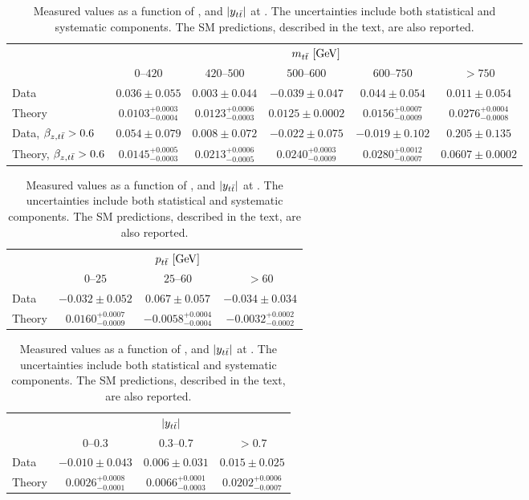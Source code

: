 \begin{table}[!htp]\centering
\begin{tabular}{l c c c c c }
  \toprule
  &\multicolumn{5}{c}{$m_{t\bar{t}}{}~[\rm{GeV}]$}    \\
  \ac{} & $0$--$420$ & $420$--$500$ & $500$--$600$ & $600$--$750$ & $>750$ \\
  \midrule
  Data & $0.036\pm0.055$ & $0.003\pm0.044$ & $-0.039\pm0.047$ & $0.044\pm0.054$ & $0.011\pm0.054$ \\
  Theory & $0.0103^{+0.0003}_{-0.0004}$ & $0.0123^{+0.0006}_{-0.0003}$ & $0.0125\pm0.0002$ & $0.0156^{+0.0007}_{-0.0009}$ & $0.0276^{+0.0004}_{-0.0008}$ \\
  \midrule
  Data, $\beta_{z,t\bar{t}}{}>0.6$  & $0.054 \pm  0.079 $ & $0.008 \pm 0.072  $ & $-0.022 \pm 0.075 $ & $-0.019 \pm 0.102    $ & $0.205 \pm 0.135$ \\
  Theory, $\beta_{z,t\bar{t}}{}>0.6$ & $0.0145^{+0.0005}_{-0.0003}$ & $0.0213^{+0.0006}_{-0.0005}$ & $0.0240^{+0.0003}_{-0.0009}$ & $0.0280^{+0.0012}_{-0.0007}$ & $0.0607 \pm 0.0002$ \\
  \bottomrule
\end{tabular}
\begin{tabular}{l c c c }
  \toprule
  &\multicolumn{3}{c}{$p_{t\bar{t}}{}~[\rm{GeV}]$}    \\
  \ac{} &     $0$--$25$           &        $25$--$60$         &  $>60$            \\
  \midrule
  Data  &    $-0.032\pm0.052$       &     $0.067\pm0.057$       &      $-0.034\pm0.034$     \\
  Theory & $0.0160^{+0.0007}_{-0.0009}$ & $-0.0058^{+0.0004}_{-0.0004}$ & $-0.0032^{+0.0002}_{-0.0002}$  \\
  \bottomrule
\end{tabular}
\begin{tabular}{l c c c }
  \toprule
  &\multicolumn{3}{c}{$|y_{t\bar{t}}{}|$}    \\
  \ac{}  &     $0$--$0.3$          &        $0.3$--$0.7$     &  $>0.7$            \\
  \midrule
  Data  &    $-0.010\pm0.043$       &     $0.006\pm0.031$     &      $0.015\pm0.025$     \\
  Theory & $0.0026^{+0.0008}_{-0.0001}$ & $0.0066^{+0.0001}_{-0.0003}$ & $0.0202^{+0.0006}_{-0.0007}$ \\
  \bottomrule
\end{tabular}
\label{tab:results7tev}
\caption{Measured \ac{} values as a function of \mtt{}, \pttt{} and
  $|y_{t\bar{t}}{}|$ at \seventev{}. The uncertainties include both statistical and
  systematic components. The SM predictions, described in the text,
  are also reported.} 
\end{table}
